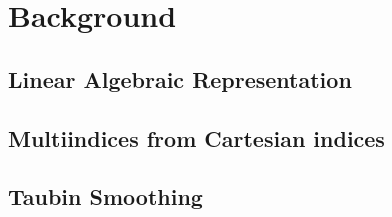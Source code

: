 \section{Background}\label{sec:background}


\subsection{Linear Algebraic Representation}\label{sec:aaaa}


\subsection{Multiindices from Cartesian indices}\label{sec:aaaa}


\subsection{Taubin Smoothing}\label{sec:aaaa}



